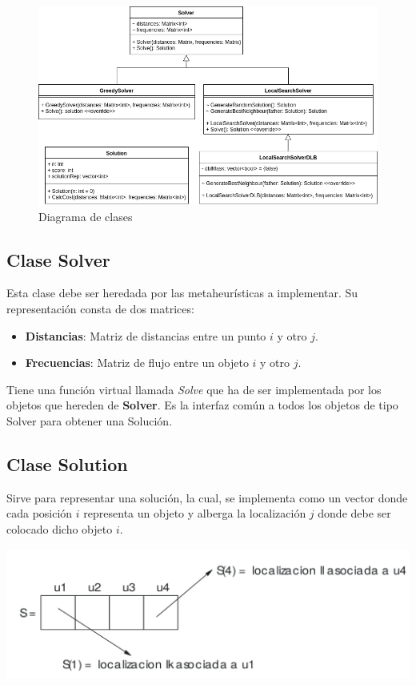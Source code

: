 \documentclass[a4paper, 12pt]{article}
\begin{document}
   \vspace*{0cm}
   \begin{figure}[H]
      \centering
      \includegraphics[scale=0.5]{clases}
      \caption{Diagrama de clases}
   \end{figure}
   
   \subsection*{Clase Solver}
   Esta clase debe ser heredada por las metaheurísticas a implementar. Su representación consta de dos matrices:
   \begin{itemize}
      \item \textbf{Distancias}: Matriz de distancias entre un punto $i$ y otro $j$.
      \item \textbf{Frecuencias}: Matriz de flujo entre un objeto $i$ y otro $j$. 
   \end{itemize}
   Tiene una función virtual llamada \textit{Solve} que ha de ser implementada por los objetos que hereden de \textbf{Solver}. Es la interfaz común a todos los objetos de tipo Solver para obtener una Solución.

   
   \newpage
   \subsection*{Clase Solution}
   Sirve para representar una solución, la cual, se implementa como un vector donde cada posición $i$ representa un objeto y alberga la localización $j$ donde debe ser colocado dicho objeto $i$. 
   
   \begin{center}
      \includegraphics[scale=0.14]{solRep}
   \end{center}
   
\end{document}
